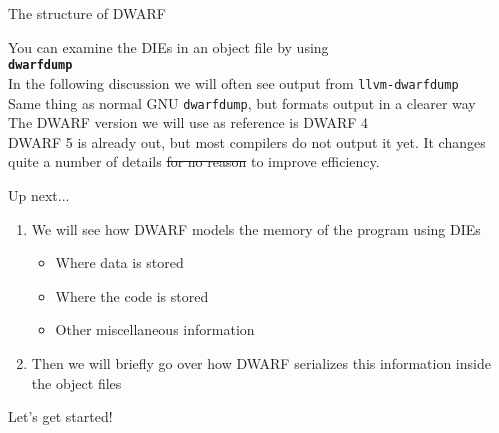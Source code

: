 \begin{frame}{The structure of DWARF}
\begin{center}
You can examine the DIEs in an object file by using\\
\texttt{\textbf{dwarfdump}}\\
\bigskip
In the following discussion we will often see output from \texttt{llvm-dwarfdump}\\
\medskip
{\footnotesize Same thing as normal GNU \texttt{dwarfdump}, but formats output in a clearer way}\\
\bigskip
\medskip
The DWARF version we will use as reference is \alert{DWARF 4}\\
\medskip
{\footnotesize DWARF 5 is already out, but most compilers do not output it yet. It changes quite a number of details \st{for no reason} to improve efficiency.}
\end{center}
\end{frame}


\begin{frame}{Up next...}
\begin{enumerate}
\item We will see \alert{how DWARF models the memory of the program} using DIEs
	\begin{itemize}
	\item Where data is stored
	\item Where the code is stored
	\item Other miscellaneous information
	\end{itemize}
\item Then we will briefly go over how \alert{DWARF serializes this information inside the object files}
\end{enumerate}
\bigskip
\centering Let's get started!\\

\end{frame}


